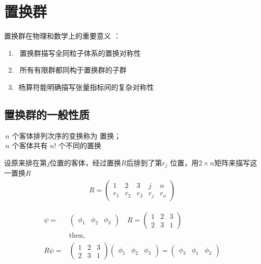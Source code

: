 
\setcounter{chapter}{5}

\chapter{置换群}

置换群在物理和数学上的重要意义 ：
\begin{enumerate}
\item  置换群描写全同粒子体系的置换对称性
\item  所有有限群都同构于置换群的子群
\item  杨算符能明确描写张量指标间的复杂对称性
\end{enumerate}


\section{置换群的一般性质}

\begin{newdef}[置换]
 $n$ 个客体排列次序的变换称为 {\color{seco}置换}；\\
 $n$ 个客体共有 $n!$ 个不同的置换
\end{newdef}


\begin{newdef}[矩阵描写]
 设原来排在第$j$位置的客体，经过置换$R$后排到了第$r_j$ 位置，用$2×n$矩阵来描写这一置换$R$
 \begin{equation}\begin{aligned}
 \label{eq.6.1.1}
R=
\begin{pmatrix}
1&2&3&j&n\\
r_1&r_2&r_3&r_j&r_n
\end{pmatrix}
\end{aligned}\end{equation}
\end{newdef}

\begin{example}[波函数]
	\begin{equation}\begin{aligned}
	\label{eq.6.1.2}
	\psi={}&
	\begin{pmatrix}
	\phi_1&\phi_2&\phi_3
	\end{pmatrix}\quad
	R=
	\begin{pmatrix}
	1&2&3\\
	2&3&1
	\end{pmatrix}\\
	&\mathrm{then},\\
	R\psi={}&
	\begin{pmatrix}
	1&2&3\\
	2&3&1
	\end{pmatrix}
	\begin{pmatrix}
	\phi_1&\phi_2&\phi_3
	\end{pmatrix}=
	\begin{pmatrix}
	\phi_3&\phi_1&\phi_2
	\end{pmatrix} 
	\end{aligned}\end{equation}
\end{example}



